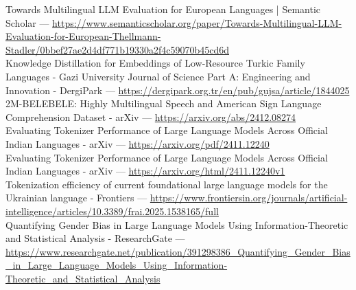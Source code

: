 \documentclass[11pt,a4paper]{article}
\begin{document}
\noindent [38] [PDF] Towards Multilingual LLM Evaluation for European Languages | Semantic Scholar --- \url{https://www.semanticscholar.org/paper/Towards-Multilingual-LLM-Evaluation-for-European-Thellmann-Stadler/0bbef27ae2d4df771b19330a2f4c59070b45cd6d}\\
\noindent [40] Knowledge Distillation for Embeddings of Low-Resource Turkic Family Languages - Gazi University Journal of Science Part A: Engineering and Innovation - DergiPark --- \url{https://dergipark.org.tr/en/pub/gujsa/article/1844025}\\
\noindent [43] [2412.08274] 2M-BELEBELE: Highly Multilingual Speech and American Sign Language Comprehension Dataset - arXiv --- \url{https://arxiv.org/abs/2412.08274}\\
\noindent [45] Evaluating Tokenizer Performance of Large Language Models Across Official Indian Languages - arXiv --- \url{https://arxiv.org/pdf/2411.12240}\\
\noindent [46] Evaluating Tokenizer Performance of Large Language Models Across Official Indian Languages - arXiv --- \url{https://arxiv.org/html/2411.12240v1}\\
\noindent [47] Tokenization efficiency of current foundational large language models for the Ukrainian language - Frontiers --- \url{https://www.frontiersin.org/journals/artificial-intelligence/articles/10.3389/frai.2025.1538165/full}\\
\noindent [49] Quantifying Gender Bias in Large Language Models Using Information-Theoretic and Statistical Analysis - ResearchGate --- \url{https://www.researchgate.net/publication/391298386_Quantifying_Gender_Bias_in_Large_Language_Models_Using_Information-Theoretic_and_Statistical_Analysis}\\
\end{document}
